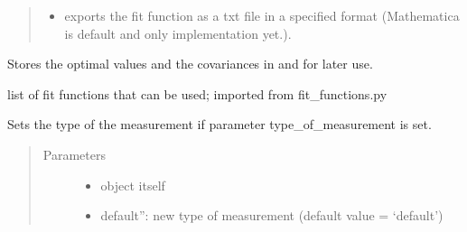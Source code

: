 \documentclass[letterpaper,10pt,english]{sphinxmanual}
\begin{document}
\begin{fulllineitems}
\begin{fulllineitems}
\begin{quote}
\begin{description}
\begin{itemize}
\item {} 
 \textendash{} exports the fit function as a txt file in a specified format (Mathematica is default and only implementation yet.).

\end{itemize}

\end{description}\end{quote}

Stores the optimal values and the covariances in  and  for
later use.

\end{fulllineitems}


\begin{fulllineitems}
\label{\detokenize{measurement:measurement.Measurement.fit_function_list}}
list of fit functions that can be used; imported from fit\_functions.py

\end{fulllineitems}


\begin{fulllineitems}
\label{\detokenize{measurement:measurement.Measurement.measurement_type}}
Sets the type of the measurement if parameter type\_of\_measurement is set.
\begin{quote}\begin{description}
\item[{Parameters}] \leavevmode\begin{itemize}
\item {} 
 \textendash{} object itself

\item {} 
 \textendash{} default”:   new type of measurement (default 
value = ‘default’)


\end{itemize}
\end{description}
\end{quote}
\end{fulllineitems}
\end{fulllineitems}
\end{document}
